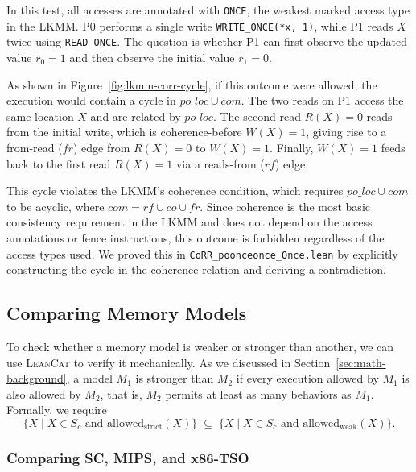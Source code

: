 In this test, all accesses are annotated with \texttt{ONCE}, the weakest marked access type in the LKMM. P0 performs a single write \texttt{WRITE\_ONCE(*x, 1)}, while P1 reads $X$ twice using \texttt{READ\_ONCE}. The question is whether P1 can first observe the updated value $r_0 = 1$ and then observe the initial value $r_1 = 0$.

As shown in Figure~\ref{fig:lkmm-corr-cycle}, if this outcome were allowed, the execution would contain a cycle in $\mathit{po\_loc} \cup \mathit{com}$. The two reads on P1 access the same location $X$ and are related by $\mathit{po\_loc}$. The second read $R(X) = 0$ reads from the initial write, which is coherence-before $W(X) = 1$, giving rise to a from-read ($\mathit{fr}$) edge from $R(X) = 0$ to $W(X) = 1$. Finally, $W(X) = 1$ feeds back to the first read $R(X) = 1$ via a reads-from ($\mathit{rf}$) edge.

This cycle violates the LKMM's coherence condition, which requires $\mathit{po\_loc} \cup \mathit{com}$ to be acyclic, where $\mathit{com} = \mathit{rf} \cup \mathit{co} \cup \mathit{fr}$. Since coherence is the most basic consistency requirement in the LKMM and does not depend on the access annotations or fence instructions, this outcome is forbidden regardless of the access types used. We proved this in \texttt{CoRR\_poonceonce\_Once.lean} by explicitly constructing the cycle in the coherence relation and deriving a contradiction.

\subsection{Comparing Memory Models}
\label{sec:comparison}

To check whether a memory model is weaker or stronger than another, we can use \textsc{LeanCat} 
to verify it mechanically. As we discussed in Section~\ref{sec:math-background}, a model 
$M_1$ is stronger than $M_2$ if every execution allowed by $M_1$ is also allowed by $M_2$, 
that is, $M_2$ permits at least as many behaviors as $M_1$. Formally, we require
%
\begin{equation}
  \{X \mid X \in S_c \text{ and } \mathrm{allowed}_{\mathrm{strict}}(X)\}
  \;\subseteq\;
  \{X \mid X \in S_c \text{ and } \mathrm{allowed}_{\mathrm{weak}}(X)\}.
\end{equation}

\subsubsection{Comparing SC, MIPS, and x86-TSO}

